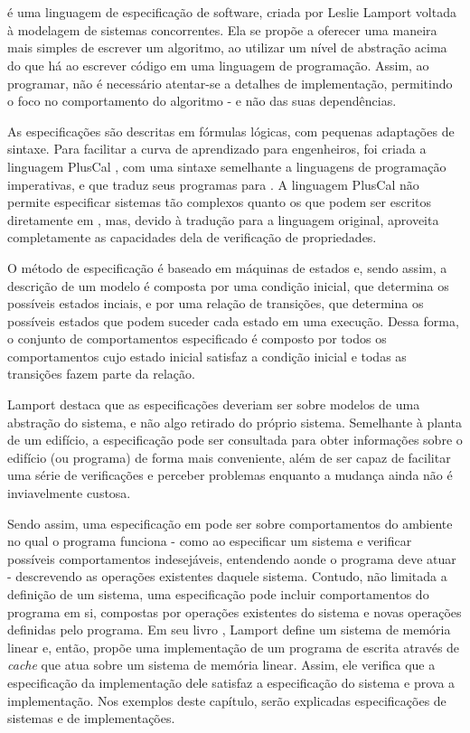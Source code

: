 \chapter{\TLA}
\label{cap2}

\TLA é uma linguagem de especificação de software, criada por Leslie Lamport \cite{tlahistory} voltada à modelagem de sistemas concorrentes. Ela se propõe a oferecer uma maneira mais simples de escrever um algoritmo, ao utilizar um nível de abstração acima do que há ao escrever código em uma linguagem de programação. Assim, ao programar, não é necessário atentar-se a detalhes de implementação, permitindo o foco no comportamento do algoritmo - e não das suas dependências.

As especificações são descritas em fórmulas lógicas, com pequenas adaptações de sintaxe. Para facilitar a curva de aprendizado para engenheiros, foi criada a linguagem PlusCal \cite{pluscal}, com uma sintaxe semelhante a linguagens de programação imperativas, e que traduz seus programas para \TLAA. A linguagem PlusCal não permite especificar sistemas tão complexos quanto os que podem ser escritos diretamente em \TLAA, mas, devido à tradução para a linguagem original, aproveita completamente as capacidades dela de verificação de propriedades.

O método de especificação é baseado em máquinas de estados \cite{tlahistory} e, sendo assim, a descrição de um modelo é composta por uma condição inicial, que determina os possíveis estados inciais, e por uma relação de transições, que determina os possíveis estados que podem suceder cada estado em uma execução. Dessa forma, o conjunto de comportamentos especificado é composto por todos os comportamentos cujo estado inicial satisfaz a condição inicial e todas as transições fazem parte da relação.

Lamport destaca \cite{hyperbook} que as especificações deveriam ser sobre modelos de uma abstração do sistema, e não algo retirado do próprio sistema. Semelhante à planta de um edifício, a especificação pode ser consultada para obter informações sobre o edifício (ou programa) de forma mais conveniente, além de ser capaz de facilitar uma série de verificações e perceber problemas enquanto a mudança ainda não é inviavelmente custosa.

Sendo assim, uma especificação em \TLA pode ser sobre comportamentos do ambiente no qual o programa funciona - como ao especificar um sistema e verificar possíveis comportamentos indesejáveis, entendendo aonde o programa deve atuar - des\-crevendo as operações existentes daquele sistema. Contudo, não limitada a definição de um sistema, uma especificação pode incluir comportamentos do programa em si, compostas por operações existentes do sistema e novas operações definidas pelo programa. Em seu livro \cite{specifying-systems}, Lamport define um sistema de memória linear e, então, propõe uma implementação de um programa de escrita através de \textit{cache} que atua sobre um sistema de memória linear. Assim, ele verifica que a especificação da implementação dele satisfaz a especificação do sistema e prova a implementação. Nos exemplos deste capítulo, serão explicadas especificações de sistemas e de implementações.

